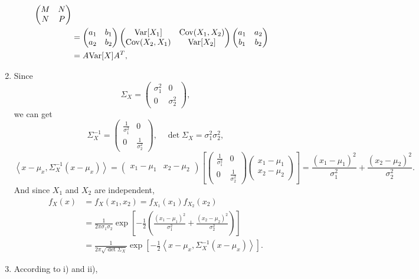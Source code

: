 \documentclass[11pt,a4paper]{article}
\begin{document}
\begin{enumerate}[label=\roman*)]
\begin{align*}
\begin{pmatrix}
M & N \\ N & P
\end{pmatrix}\\
&=\begin{pmatrix}a_1 & b_1 \\a_2 & b_2\end{pmatrix}
\begin{pmatrix}{\rm Var}[X_1] & {\rm Cov}(X_1,X_2) \\ {\rm Cov}(X_2,X_1) & {\rm Var}[X_2] \end{pmatrix}
\begin{pmatrix}a_1 & a_2 \\b_1 & b_2\end{pmatrix}\\
&=A{\rm Var}[X]A^T,
\end{align*}
\item
Since
$$\Sigma_X=\begin{pmatrix}
\sigma_1^2 & 0 \\ 0 & \sigma_2^2
\end{pmatrix},$$
we can get
$$\Sigma^{-1}_X=\begin{pmatrix}
\frac{1}{\sigma_1^2} & 0 \\ 0 & \frac{1}{\sigma_2^2}
\end{pmatrix},\quad \det\Sigma_X=\sigma_1^2\sigma_2^2,$$
$$\left\langle x-\mu_x, \Sigma^{-1}_X (x-\mu_x) \right\rangle=
\begin{pmatrix}x_1-\mu_1 & x_2-\mu_2\end{pmatrix}
\left[\begin{pmatrix}\frac{1}{\sigma_1^2} & 0 \\ 0 & \frac{1}{\sigma_2^2}\end{pmatrix}
\begin{pmatrix}x_1-\mu_1 \\ x_2-\mu_2\end{pmatrix}\right]
=\frac{(x_1-\mu_1)^2}{\sigma_1^2}+\frac{(x_2-\mu_2)^2}{\sigma_2^2}.
$$
And since $X_1$ and $X_2$ are independent,
\begin{align*}
f_X(x)&=f_X(x_1,x_2)=f_{X_1}(x_1)f_{X_2}(x_2)\\
&=\frac{1}{2\pi\sigma_1\sigma_2}\exp\left[-\frac{1}{2}\left(\frac{(x_1-\mu_1)^2}{\sigma_1^2}+\frac{(x_2-\mu_2)^2}{\sigma_2^2}\right)\right]\\
&=\frac{1}{2\pi\sqrt{\det\Sigma_X}}\exp\left[-\frac{1}{2}\left\langle x-\mu_x, \Sigma^{-1}_X (x-\mu_x) \right\rangle\right].
\end{align*}
\item
According to i) and ii),

\end{enumerate}
\end{document}
